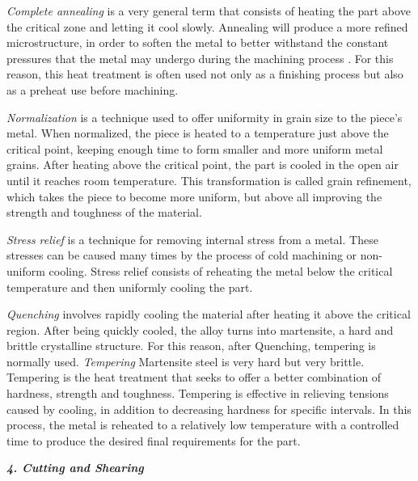 \emph{Complete annealing} is a very general term that consists of heating the part above the critical zone and letting it cool slowly. Annealing will produce a more refined microstructure, in order to soften the metal to better withstand the constant pressures that the metal may undergo during the machining process \cite{huang2006hardening}. For this reason, this heat treatment is often used not only as a finishing process but also as a preheat use before machining. \cite{bryson2005heat,souza2015estudo}

\emph{Normalization} is a technique used to offer uniformity in grain size to the piece's metal. When normalized, the piece is heated to a temperature just above the critical point, keeping enough time to form smaller and more uniform metal grains. After heating above the critical point, the part is cooled in the open air until it reaches room temperature.
 This transformation is called grain refinement, which takes the piece to become more uniform, but above all improving the strength and toughness of the material.\cite{bryson2005heat,souza2015estudo}
 
\emph{Stress relief} is a technique for removing internal stress from a metal. These stresses can be caused many times by the process of cold machining or non-uniform cooling. Stress relief consists of reheating the metal below the critical temperature and then uniformly cooling the part.\cite{bryson2005heat}

\emph{Quenching} involves rapidly cooling the material after heating it above the critical region. After being quickly cooled, the alloy turns into martensite, a hard and brittle crystalline structure. For this reason, after Quenching, tempering is normally used.\cite{bryson2005heat,souza2015estudo}
\emph{Tempering}
Martensite steel is very hard but very brittle. Tempering is the heat treatment that seeks to offer a better combination of hardness, strength and toughness.
Tempering is effective in relieving tensions caused by cooling, in addition to decreasing hardness for specific intervals.\cite{bryson2005heat,souza2015estudo}
In this process, the metal is reheated to a relatively low temperature with a controlled time to produce the desired final requirements for the part.

\vspace{50}

\textbf{ \emph{4. Cutting and Shearing}}\\


